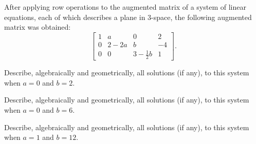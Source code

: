 \begin{example} After applying row operations to the augmented matrix of a system of linear equations, each of which describes a plane in 3-space, the following augmented matrix was obtained:
\[\renewcommand{\arraystretch}{1.4} \left[ \begin{array}{ccc|r} 1&a&0&2 \\ 0&2-2a&b&-4 \\ 0&0&3-\frac{1}{2}b&1 \end{array} \right].\]
	\ba
	\item Describe, algebraically and geometrically, all solutions (if any), to this system when $a=0$ and $b=2$. 
	\item  Describe, algebraically and geometrically, all solutions (if any), to this system when $a=0$ and $b=6$. 
	\item  Describe, algebraically and geometrically, all solutions (if any), to this system when $a=1$ and $b=12$. 
	\ea



\end{example}
